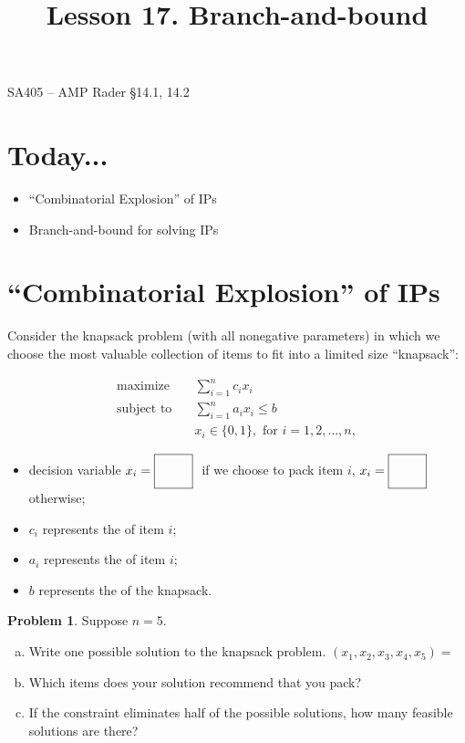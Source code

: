 \documentclass[11pt]{article}
\makeatletter
\renewcommand{\labelitemi}{$\bullet$}
\theoremstyle{definition}
\newtheorem{problem}{Problem}
\newcommand{\answerbox}[3]{%
  \fbox{%
    \begin{minipage}[#1]{#2}
      \hfill\vspace{#3}
    \end{minipage}
  }
}
\newcommand{\answerboxone}[2]{%
  \answerbox{#1}{6.0in}{#2} 
}
\newcommand{\wordbox}{\answerbox{c}{1.2in}{.7cm}}
\newcommand{\letterbox}{\answerbox{c}{.7cm}{.7cm}}
\newcommand{\maximize}{\text{maximize}}
\newcommand{\subjectto}{\text{subject to}}
\renewcommand{\maketitle}{
  \noindent SA405 -- AMP \hfill Rader \S 14.1, 14.2  \\

  \begin{center}\Large{\textbf{\@title}}\end{center}
}
\makeatother
\begin{document}
  
\title{Lesson 17.  Branch-and-bound}

\maketitle

\section{Today...}
\begin{itemize}
\item ``Combinatorial Explosion'' of IPs
\item Branch-and-bound for solving IPs
\end{itemize}

\section{``Combinatorial Explosion'' of IPs}

Consider the knapsack problem (with all nonegative parameters) in which we choose the most valuable collection of items to fit into a limited size ``knapsack'':

    \begin{align*}
      \maximize \quad & \sum_{i=1}^n c_i x_i \\
      \subjectto \quad & \sum_{i=1}^n a_i x_i \leq b \\
                       & x_i \in \{0,1\}, \text{ for } i = 1, 2,\dots,n,
    \end{align*}
\begin{itemize}
\item decision variable $x_i = \letterbox~$ if we choose to pack item $i$, $x_i = \letterbox$ otherwise;
\item $c_i$ represents the \wordbox of item $i$;
\item $a_i$ represents the \wordbox of item $i$;
\item $b$ represents the \wordbox of the knapsack.
\end{itemize}

\bigskip
\begin{problem}
Suppose $n = 5$.  
\begin{enumerate}[(a)]
\item Write one possible solution to the knapsack problem. $(x_1, x_2, x_3, x_4, x_5) =$ \wordbox
\item Which items does your solution recommend that you pack?  

\answerboxone{c}{1cm}

\item If the constraint eliminates half of the possible solutions, how many feasible solutions are there?  

\answerboxone{c}{1cm}
\end{enumerate}
\end{problem}
\end{document}
